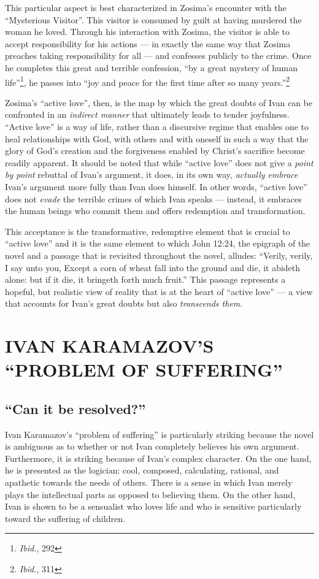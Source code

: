 This particular aspect is best characterized in Zosima's encounter with the ``Mysterious Visitor''. This visitor is consumed by guilt at having murdered the woman he loved. Through his interaction with Zosima, the visitor is able to accept responsibility for his actions --- in exactly the same way that Zosima preaches taking responsibility for all --- and confesses publicly to the crime. Once he completes this great and terrible confession, ``by a great mystery of human life''\footnote{\emph{Ibid.}, 292}, he passes into ``joy and peace for the first time after so many years.''\footnote{\emph{Ibid.}, 311}  

Zosima's ``active love'', then, is the map by which the great doubts of Ivan can be confronted in an \emph{indirect manner} that ultimately leads to tender joyfulness. ``Active love'' is a way of life, rather than a discursive regime that enables one to heal relationships with God, with others and with oneself in such a way that the glory of God's creation and the forgiveness enabled by Christ's sacrifice become readily apparent. It should be noted that while ``active love'' does not give a \emph{point by point} rebuttal of Ivan's argument, it does, in its own way, \emph{actually embrace} Ivan's argument more fully than Ivan does himself. In other words, ``active love'' does not \emph{evade} the terrible crimes of which Ivan speaks --- instead, it embraces the human beings who commit them and offers redemption and transformation. 

This acceptance is the transformative, redemptive element that is crucial to ``active love'' and it is the same element to which John 12:24, the epigraph of the novel and a passage that is revisited throughout the novel, alludes: ``Verily, verily, I say unto you, Except a corn of wheat fall into the ground and die, it abideth alone: but if it die, it bringeth forth much fruit.'' This passage represents a hopeful, but realistic view of reality that is at the heart of ``active love'' --- a view that accounts for Ivan's great doubts but also \emph{transcends them.}


\chapter{IVAN KARAMAZOV'S ``PROBLEM OF SUFFERING''}
\section{``Can it be resolved?''}
Ivan Karamazov's ``problem of suffering'' is particularly striking because the novel is ambiguous as to whether or not Ivan completely believes his own argument. Furthermore, it is striking because of Ivan's complex character. On the one hand, he is presented as the logician: cool, composed, calculating, rational, and apathetic towards the needs of others. There is a sense in which Ivan merely plays the intellectual parts as opposed to believing them. On the other hand, Ivan is shown to be a sensualist who loves life and who is sensitive particularly toward the suffering of children. 

